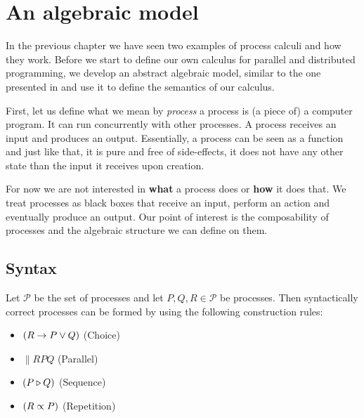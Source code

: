\chapter{An algebraic model}
\label{chp:algebraic_model}
In the previous chapter we have seen two examples of process calculi and how they work. Before we start to define our own calculus for parallel and distributed programming, we develop an abstract algebraic model, similar to the one presented in \cite{Hoare:2012:LPU:2368298.2368301} and use it to define the semantics of our calculus.

First, let us define what we mean by \textit{process} a process is (a piece of) a computer program. It can run concurrently with other processes. A process receives an input and produces an output. Essentially, a process can be seen as a function and just like that, it is pure and free of side-effects, it does not have any other state than the input it receives upon creation.

For now we are not interested in \textbf{what} a process does or \textbf{how} it does that. We treat processes as black boxes that receive an input, perform an action and eventually produce an output. Our point of interest is the composability of processes and the algebraic structure we can define on them.

\section{Syntax}
\label{chp:syntax}
Let $\mathcal{P}$ be the set of processes and let $P, Q, R \in \mathcal{P}$ be processes. Then syntactically correct processes can be formed by using the following construction rules:
\begin{itemize}
  \item $\left( R \to P \vee Q \right)$ \hspace*{2.3em} (Choice)
  \item $\parallel{R}{P}{Q}$ \hspace*{2.8em} (Parallel)
  \item $\left( P \triangleright Q \right)$ \hspace*{4.8em} (Sequence)
  \item $\left( R \propto P \right)$ \hspace*{4.4em} (Repetition)
\end{itemize}

